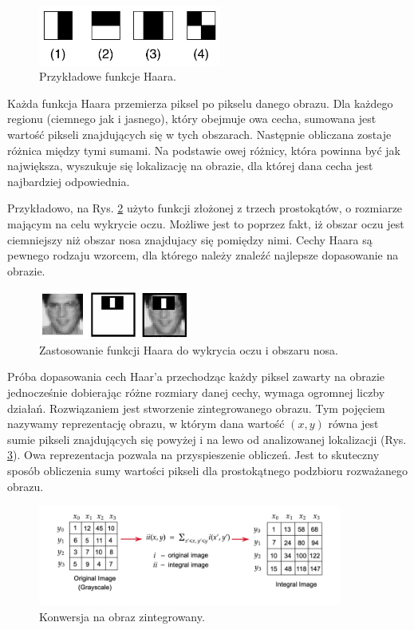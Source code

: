 \begin{figure}[h]
	\centering
	\includegraphics[width=6cm]{haar_features.png}
	\caption{Przykładowe funkcje Haara. \cite{haarCascade}} 
	\label{fig:haarFeatures}
\end{figure}

Każda funkcja Haara przemierza piksel po pikselu danego obrazu. Dla każdego regionu (ciemnego jak i jasnego), który obejmuje owa cecha, sumowana jest wartość pikseli znajdujących się w tych obszarach. Następnie obliczana zostaje różnica między tymi sumami. Na podstawie owej różnicy, która powinna być jak największa, wyszukuje się lokalizację na obrazie, dla której dana cecha jest najbardziej odpowiednia. 


 
Przykładowo, na Rys. \ref{fig:haarNose} użyto funkcji złożonej z trzech prostokątów, o rozmiarze mającym na celu wykrycie oczu. Możliwe jest to poprzez fakt, iż obszar oczu jest ciemniejszy niż obszar nosa znajdujacy się pomiędzy nimi. Cechy Haara są pewnego rodzaju wzorcem, dla którego należy znaleźć najlepsze dopasowanie na obrazie.
 
\begin{figure}[h]
	\centering
	\includegraphics[width=5cm]{haar_nose_feature.png}
	\caption{Zastosowanie funkcji Haara do wykrycia oczu i obszaru nosa.} 
	\label{fig:haarNose}
\end{figure}
 
Próba dopasowania cech Haar'a przechodząc każdy piksel zawarty na obrazie jednocześnie dobierając różne rozmiary danej cechy, wymaga ogromnej liczby działań. Rozwiązaniem jest stworzenie zintegrowanego obrazu. Tym pojęciem nazywamy reprezentację obrazu, w którym dana wartość $(x, y)$ równa jest sumie pikseli znajdujących się powyżej i na lewo od analizowanej lokalizacji (Rys. \ref{fig:integralImage}). Owa reprezentacja pozwala na przyspieszenie obliczeń. Jest to skuteczny sposób obliczenia sumy wartości pikseli dla prostokątnego podzbioru rozważanego obrazu.
 
 \begin{figure}[h]
	\centering
	\includegraphics[width=10cm]{integral.png}
	\caption{Konwersja na obraz zintegrowany. \cite{haarCascade}} 
	\label{fig:integralImage}
\end{figure}
 
